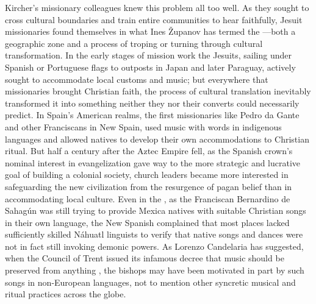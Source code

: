 Kircher's missionary colleagues knew this problem all too well.
As they sought to cross cultural boundaries and train entire communities to
hear faithfully, Jesuit missionaries found themselves in what Ines Županov has
termed the ---both a geographic zone and a process
of troping or turning through cultural transformation.%
    \Autocite{Zupanov:MissionaryTropics}
In the early stages of mission work the Jesuits, sailing under Spanish or
Portuguese flags to outposts in Japan and later Paraguay, actively sought to
accommodate local customs and music; but everywhere that missionaries brought
Christian faith, the process of cultural translation inevitably transformed it
into something neither they nor their converts could necessarily predict.%
    \Autocites
    {Bailey:Art}
    {Fromont:DancingKingCongo}
In Spain's American realms, the first missionaries like Pedro da Gante
and other Franciscans in New Spain, used music with words in indigenous
languages and allowed natives to develop their own accommodations to Christian
ritual.%
But half a century after the Aztec Empire fell, as the Spanish crown's
nominal interest in evangelization gave way to the more strategic and lucrative
goal of building a colonial society, church leaders became more interested in
safeguarding the new civilization from the resurgence of pagan belief than in
accommodating local culture. 
Even in the \citXXX[1580s], as the Franciscan Bernardino de Sahagún was still
trying to provide Mexica natives with suitable Christian songs in their own
language, the New Spanish \citXXX[bishops] complained that most places
lacked sufficiently skilled Náhuatl linguists to verify that native songs and
dances were not in fact still invoking demonic powers.%
    \Autocite[637]{Candelaria:Psalmodia}
As Lorenzo Candelaria has suggested, when the Council of Trent issued its
infamous decree that music should be preserved from anything , the bishops may have been motivated in part by such songs
in non-European languages, not to mention other syncretic musical and ritual
practices across the globe.%
    \Autocite[637--638]{Candelaria:Psalmodia}

